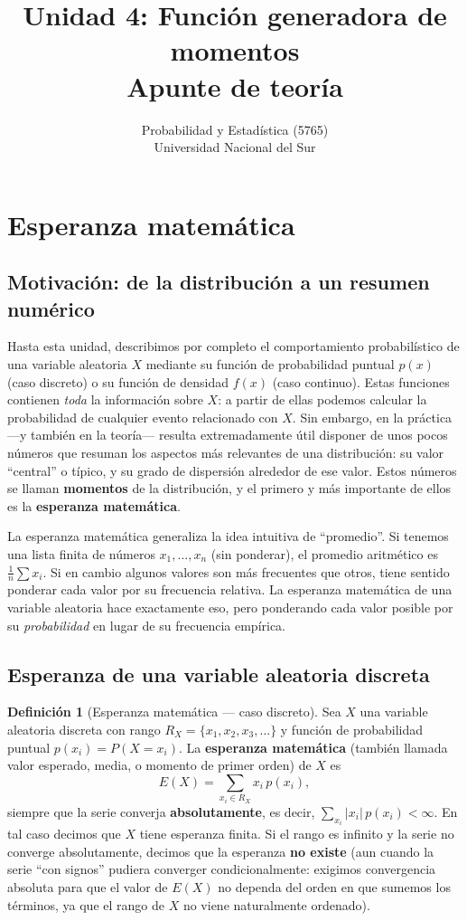 \documentclass[11pt,a4paper]{article}
\title{Unidad 4: Función generadora de momentos \\ \large Apunte de teoría}
\author{Probabilidad y Estadística (5765) \\ Universidad Nacional del Sur}
\date{}
\theoremstyle{plain}
\theoremstyle{definition}
\newtheorem{definicion}[teorema]{Definición}
\theoremstyle{remark}
\begin{document}
\maketitle
\tableofcontents
\newpage

\section{Esperanza matemática}

\subsection{Motivación: de la distribución a un resumen numérico}

Hasta esta unidad, describimos por completo el comportamiento probabilístico de una variable aleatoria $X$ mediante su función de probabilidad puntual $p(x)$ (caso discreto) o su función de densidad $f(x)$ (caso continuo). Estas funciones contienen \emph{toda} la información sobre $X$: a partir de ellas podemos calcular la probabilidad de cualquier evento relacionado con $X$. Sin embargo, en la práctica —y también en la teoría— resulta extremadamente útil disponer de unos pocos números que resuman los aspectos más relevantes de una distribución: su valor ``central'' o típico, y su grado de dispersión alrededor de ese valor. Estos números se llaman \textbf{momentos} de la distribución, y el primero y más importante de ellos es la \textbf{esperanza matemática}.

La esperanza matemática generaliza la idea intuitiva de ``promedio''. Si tenemos una lista finita de números $x_1,\dots,x_n$ (sin ponderar), el promedio aritmético es $\frac1n\sum x_i$. Si en cambio algunos valores son más frecuentes que otros, tiene sentido ponderar cada valor por su frecuencia relativa. La esperanza matemática de una variable aleatoria hace exactamente eso, pero ponderando cada valor posible por su \emph{probabilidad} en lugar de su frecuencia empírica.

\subsection{Esperanza de una variable aleatoria discreta}

\begin{definicion}[Esperanza matemática --- caso discreto]
Sea $X$ una variable aleatoria discreta con rango $R_X=\{x_1,x_2,x_3,\dots\}$ y función de probabilidad puntual $p(x_i)=P(X=x_i)$. La \textbf{esperanza matemática} (también llamada valor esperado, media, o momento de primer orden) de $X$ es
\[
E(X) = \sum_{x_i \in R_X} x_i\, p(x_i),
\]
siempre que la serie converja \textbf{absolutamente}, es decir, $\sum_{x_i} |x_i|\,p(x_i) < \infty$. En tal caso decimos que $X$ tiene esperanza finita. Si el rango es infinito y la serie no converge absolutamente, decimos que la esperanza \textbf{no existe} (aun cuando la serie ``con signos'' pudiera converger condicionalmente: exigimos convergencia absoluta para que el valor de $E(X)$ no dependa del orden en que sumemos los términos, ya que el rango de $X$ no viene naturalmente ordenado).
\end{definicion}
\end{document}
